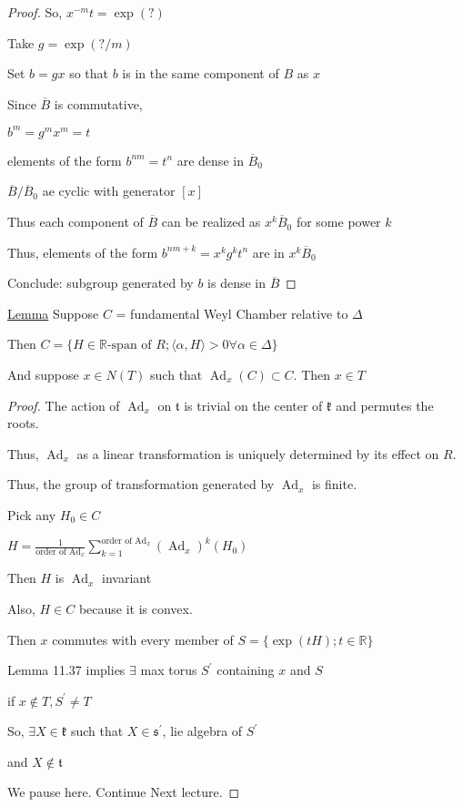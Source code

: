 \documentclass{article}
\theoremstyle{definition}
\newcommand{\Ad}{\operatorname{Ad}}
\begin{document}
\begin{proof}
    So, \(x^{-m}t=\exp(?)\)
    
    Take \(g = \exp (? / m)\) 

    Set \(b=gx\) so that \(b\) is in the same component of \(B\) as \(x\) 
    
    Since \(\overline{B}\) is commutative,
    
    \(b^m = g^m x^m = t\)
    
    elements of the form \(b^{nm}=t^n\) are dense in \(\overline{B}_0\)
    
    \(\overline{B} / \overline{B}_0\) ae cyclic with generator \([x]\) 
    
    Thus each component of \(\overline{B}\) can be realized as \(x^k \overline{B}_0\) for some power \(k\)
    
    Thus, elements of the form \(b^{nm+k}=x^k g^k t^n\) are in \(x^k \overline{B}_0\)  

    Conclude: subgroup generated by \(b\) is dense in \(\overline{B} \)  

\end{proof}

\underline{Lemma} Suppose \(C\) = fundamental Weyl Chamber relative to \(\Delta\)
    
Then \(C = \{ H\in \mathbb{R} \text{-span of } R; \langle \alpha , H \rangle > 0 \forall \alpha \in \Delta  \} \)

And suppose \(x\in N(T)\) such that \(\Ad_x (C) \subset C\). Then \(x\in T\) 

\begin{proof}
    The action of \(\Ad_x\) on \(\mathfrak{t}\) is trivial on the center of \(\mathfrak{k}\) and permutes the roots.
    
    Thus, \(\Ad_x\) as a linear transformation is uniquely determined by its effect on \(R\).

    Thus, the group of transformation generated by \(\Ad_x\) is finite.

    Pick any \(H_0\in C\)

    \(H = \frac{1}{\text{order of } \Ad_x}\sum_{k=1}^{\text{order of } \Ad_x} (\Ad_x)^k (H_0) \) 

    Then \(H\) is \(\Ad_x\) invariant

    Also, \(H\in C\) because it is convex.

    Then \(x\) commutes with every member of \(S = \{ \exp(tH); t\in\mathbb{R}\} \)

    Lemma 11.37 implies \(\exists\) max torus \(S^{\prime}\) containing \(x\) and \(S\) 
    
    if \(x \notin T, S^{\prime} \neq T\)
    
    So, \(\exists X\in \mathfrak{k}\) such that \(X\in \mathfrak{s}^{\prime}\), lie algebra of \(S^{\prime}\)   

    and \(X \notin \mathfrak{t}\) 

    We pause here. Continue Next lecture.

\end{proof}
\end{document}
